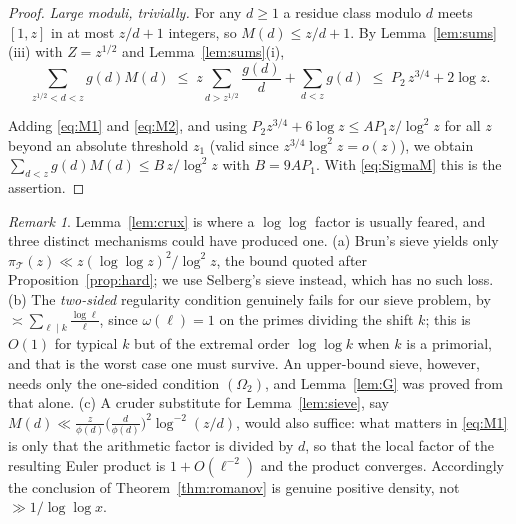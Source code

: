 \documentclass[10pt]{article}
\theoremstyle{definition}
\theoremstyle{remark}
\newtheorem{remark}{Remark}
\newcommand{\T}{\mathcal{T}}
\begin{document}
\begin{proof}
\emph{Large moduli, trivially.} For any $d \ge 1$ a residue class modulo $d$
meets $[1,z]$ in at most $z/d + 1$ integers, so $M(d) \le z/d + 1$. By
Lemma~\ref{lem:sums}(iii) with $Z = z^{1/2}$ and Lemma~\ref{lem:sums}(i),
\begin{equation}\label{eq:M2}
  \sum_{z^{1/2} < d < z} g(d)M(d)
  \;\le\; z \sum_{d > z^{1/2}}\frac{g(d)}{d} + \sum_{d < z} g(d)
  \;\le\; P_2\,z^{3/4} + 2\log z .
\end{equation}

Adding \eqref{eq:M1} and \eqref{eq:M2}, and using
$P_2 z^{3/4} + 6\log z \le AP_1 z/\log^{2}z$ for all $z$ beyond an absolute
threshold $z_1$ (valid since $z^{3/4}\log^{2}z = o(z)$), we obtain
$\sum_{d<z} g(d)M(d) \le B\,z/\log^{2}z$ with $B = 9AP_1$. With
\eqref{eq:SigmaM} this is the assertion.
\end{proof}

\begin{remark}\label{rem:nologlog}
Lemma~\ref{lem:crux} is where a $\log\log$ factor is usually feared, and three
distinct mechanisms could have produced one. (a) Brun's sieve yields only
$\pi_\T(z) \ll z(\log\log z)^{2}/\log^{2}z$, the bound quoted after
Proposition~\ref{prop:hard}; we use Selberg's sieve instead, which has no such
loss. (b) The \emph{two-sided} regularity condition genuinely fails for our
sieve problem, by $\asymp \sum_{\ell \mid k}\frac{\log\ell}{\ell}$, since
$\omega(\ell) = 1$ on the primes dividing the shift $k$; this is $O(1)$ for
typical $k$ but of the extremal order $\log\log k$ when $k$ is a primorial,
and that is the worst case one must survive. An upper-bound sieve, however,
needs only the one-sided
condition $(\Omega_2)$, and Lemma~\ref{lem:G} was proved from that alone.
(c) A cruder substitute for Lemma~\ref{lem:sieve}, say
$M(d) \ll \frac{z}{\phi(d)}\bigl(\frac{d}{\phi(d)}\bigr)^{2}\log^{-2}(z/d)$,
would also suffice: what matters in \eqref{eq:M1} is only that the arithmetic
factor is divided by $d$, so that the local factor of the resulting Euler
product is $1 + O(\ell^{-2})$ and the product converges. Accordingly the
conclusion of Theorem~\ref{thm:romanov} is genuine positive density, not
$\gg 1/\log\log x$.
\end{remark}
\end{document}
